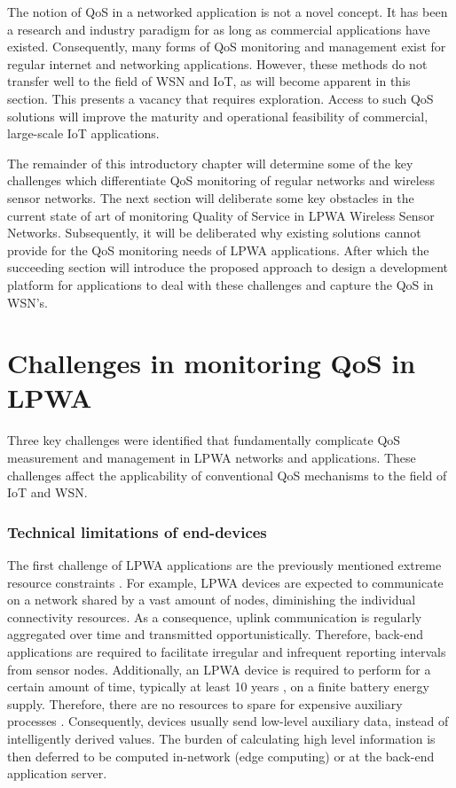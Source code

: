 The notion of QoS in a networked application is not a novel concept. It has been a research and industry paradigm for as long as commercial applications have existed. Consequently, many forms of QoS monitoring and management exist for regular internet and networking applications. However, these methods do not transfer well to the field of WSN and IoT, as will become apparent in this section. This presents a vacancy that requires exploration. Access to such QoS solutions will improve the maturity and operational feasibility of commercial, large-scale IoT applications.

The remainder of this introductory chapter will determine some of the key challenges which differentiate QoS monitoring of regular networks and wireless sensor networks. The next section will deliberate some key obstacles in the current state of art of monitoring Quality of Service in LPWA Wireless Sensor Networks. Subsequently, it will be deliberated why existing solutions cannot provide for the QoS monitoring  needs of LPWA applications. After which the succeeding section will introduce the proposed approach to design a development platform for applications to deal with these challenges and capture the QoS in WSN's.

\section{Challenges in monitoring QoS in LPWA}
\label{sec:challenges}
Three key challenges were identified that fundamentally complicate QoS measurement and management in LPWA networks and applications. These challenges affect the applicability of conventional QoS mechanisms to the field of IoT and WSN. %

\subsubsection{Technical limitations of end-devices}
The first challenge of LPWA applications are the previously mentioned extreme resource constraints \cite{key_features, value_of}. For example, LPWA devices are expected to communicate on a network shared by a vast amount of nodes, diminishing the individual connectivity resources. As a consequence, uplink communication is regularly aggregated over time and transmitted opportunistically. Therefore, back-end applications are required to facilitate irregular and infrequent reporting intervals from sensor nodes. Additionally, an LPWA device is required to perform for a certain amount of time, typically at least 10 years \cite{tmobile, vodafone, nbiot_vs_lora}, on a finite battery energy supply. Therefore, there are no resources to spare for expensive auxiliary processes \cite{energy_challenges}. Consequently, devices usually send low-level auxiliary data, instead of intelligently derived values. The burden of calculating high level information is then deferred to be computed in-network (edge computing) or at the back-end application server.

